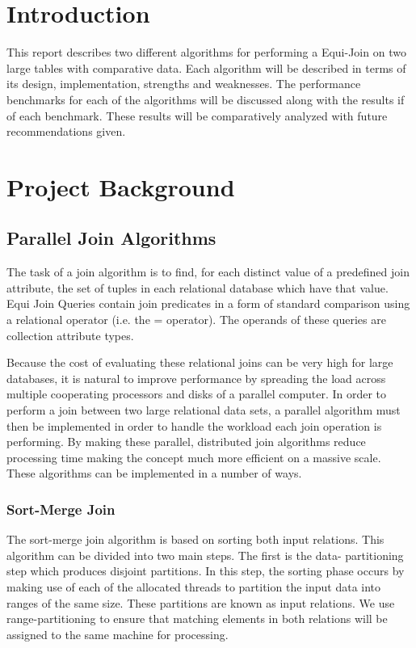 \documentclass[10pt,twocolumn]{witseiepaper}
\begin{document}
\section{Introduction}

This report describes two different algorithms for performing a Equi-Join on two large tables with comparative data. Each algorithm will be described in terms of its design, implementation, strengths and weaknesses. The performance benchmarks for each of the algorithms will be discussed along with the results if of each benchmark. These results will be comparatively analyzed with future recommendations given.

\section{Project Background}

\subsection{Parallel Join Algorithms}

The task of a join algorithm is to find, for each distinct value of a predefined join attribute, the set of tuples in each relational database which have that value. Equi Join Queries contain join predicates in a form of standard comparison using a relational operator (i.e. the = operator). The operands of these queries are collection attribute types.

Because the cost of evaluating these relational joins can be very high for large databases, it is natural to improve performance by spreading the load across multiple cooperating processors and disks of a parallel computer. In order to perform a join between two large relational data sets, a parallel algorithm must then be implemented in order to handle the workload each join operation is performing. By making these parallel, distributed join algorithms reduce processing time making the concept much more efficient on a massive scale. These algorithms can be implemented in a number of ways.

\subsubsection{Sort-Merge Join}\label{sortmerge}

The sort-merge join algorithm is based on sorting both input relations. This algorithm can be divided into two main steps. The first is the data- partitioning step which produces disjoint partitions. In this step, the sorting phase occurs by making use of each of the allocated threads to partition the input data into ranges of the same size. These partitions are known as input relations. We use range-partitioning to ensure that matching elements in both relations will be assigned to the same machine for processing. 
\end{document}
